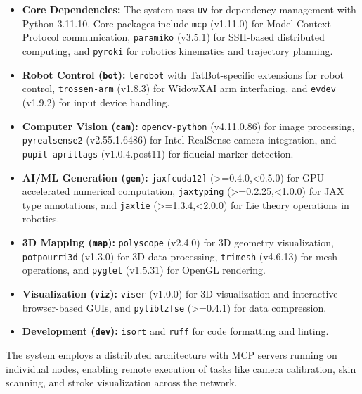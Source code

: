 \documentclass[11pt]{article}
\begin{document}
\begin{itemize}
    \item \textbf{Core Dependencies:} The system uses \texttt{uv} for dependency management with Python 3.11.10. Core packages include \texttt{mcp} (v1.11.0) for Model Context Protocol communication, \texttt{paramiko} (v3.5.1) for SSH-based distributed computing, and \texttt{pyroki} for robotics kinematics and trajectory planning.
    
    \item \textbf{Robot Control (\texttt{bot}):} \texttt{lerobot} with TatBot-specific extensions for robot control, \texttt{trossen-arm} (v1.8.3) for WidowXAI arm interfacing, and \texttt{evdev} (v1.9.2) for input device handling.
    
    \item \textbf{Computer Vision (\texttt{cam}):} \texttt{opencv-python} (v4.11.0.86) for image processing, \texttt{pyrealsense2} (v2.55.1.6486) for Intel RealSense camera integration, and \texttt{pupil-apriltags} (v1.0.4.post11) for fiducial marker detection.
    
    \item \textbf{AI/ML Generation (\texttt{gen}):} \texttt{jax[cuda12]} (>=0.4.0,<0.5.0) for GPU-accelerated numerical computation, \texttt{jaxtyping} (>=0.2.25,<1.0.0) for JAX type annotations, and \texttt{jaxlie} (>=1.3.4,<2.0.0) for Lie theory operations in robotics.
    
    \item \textbf{3D Mapping (\texttt{map}):} \texttt{polyscope} (v2.4.0) for 3D geometry visualization, \texttt{potpourri3d} (v1.3.0) for 3D data processing, \texttt{trimesh} (v4.6.13) for mesh operations, and \texttt{pyglet} (v1.5.31) for OpenGL rendering.
    
    \item \textbf{Visualization (\texttt{viz}):} \texttt{viser} (v1.0.0) for 3D visualization and interactive browser-based GUIs, and \texttt{pyliblzfse} (>=0.4.1) for data compression.
    
    \item \textbf{Development (\texttt{dev}):} \texttt{isort} and \texttt{ruff} for code formatting and linting.
\end{itemize}

The system employs a distributed architecture with MCP servers running on individual nodes, enabling remote execution of tasks like camera calibration, skin scanning, and stroke visualization across the network.
\end{document}
